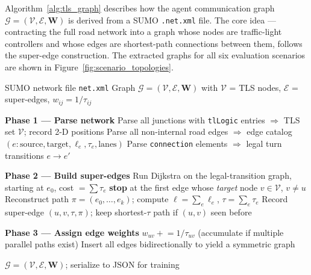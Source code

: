 Algorithm~\ref{alg:tls_graph} describes how the agent communication graph $\mathcal{G}=(\mathcal{V},\mathcal{E},\mathbf{W})$ is derived from a SUMO \texttt{.net.xml} file. The core idea — contracting the full road network into a graph whose nodes are traffic-light controllers and whose edges are shortest-path connections between them, follows the super-edge construction. The extracted graphs for all six evaluation scenarios are shown in Figure~\ref{fig:scenario_topologies}.

\begin{algorithm}[ht]
  \caption{TLS Communication Graph Extraction from SUMO \texttt{.net.xml}}
  \label{alg:tls_graph}
  \begin{algorithmic}[1]
    \Require SUMO network file \texttt{net.xml}
    \Ensure Graph $\mathcal{G}=(\mathcal{V},\mathcal{E},\mathbf{W})$ with $\mathcal{V}$ = TLS nodes, $\mathcal{E}$ = super-edges, $w_{ij}=1/\tau_{ij}$

    \Statex \textbf{Phase 1 — Parse network}
    \State Parse all junctions with \texttt{tlLogic} entries $\Rightarrow$ TLS set $\mathcal{V}$; record 2-D positions
    \State Parse all non-internal road edges $\Rightarrow$ edge catalog $(e\!: \text{source}, \text{target}, \ell_e, \tau_e, \text{lanes})$
    \State Parse \texttt{connection} elements $\Rightarrow$ legal turn transitions $e \to e'$

    \Statex \textbf{Phase 2 — Build super-edges}
    \State Run Dijkstra on the legal-transition graph, starting at $e_0$, cost $= \sum \tau_e$
    \State \textbf{stop} at the first edge whose \emph{target} node $v \in \mathcal{V}$, $v \ne u$
    \State Reconstruct path $\pi=(e_0,\ldots,e_k)$; compute $\ell = \sum_e \ell_e$, $\tau = \sum_e \tau_e$
    \State Record super-edge $(u,v,\tau,\pi)$; keep shortest-$\tau$ path if $(u,v)$ seen before
    \EndIf
    \EndFor
    \EndFor

    \Statex \textbf{Phase 3 — Assign edge weights}
    \State $w_{uv} \mathrel{+}= 1/\tau_{uv}$ \quad (accumulate if multiple parallel paths exist)
    \EndFor
    \State Insert all edges bidirectionally to yield a symmetric graph

    \State \Return $\mathcal{G}=(\mathcal{V},\mathcal{E},\mathbf{W})$; serialize to JSON for training
  \end{algorithmic}
\end{algorithm}

